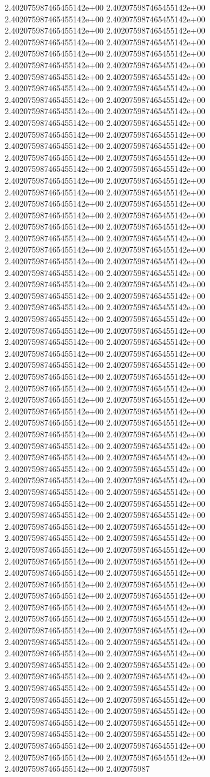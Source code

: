 2.402075987465455142e+00	2.402075987465455142e+00	2.402075987465455142e+00	2.402075987465455142e+00	2.402075987465455142e+00	2.402075987465455142e+00	2.402075987465455142e+00	2.402075987465455142e+00	2.402075987465455142e+00	2.402075987465455142e+00	2.402075987465455142e+00	2.402075987465455142e+00	2.402075987465455142e+00	2.402075987465455142e+00	2.402075987465455142e+00	2.402075987465455142e+00	2.402075987465455142e+00	2.402075987465455142e+00	2.402075987465455142e+00	2.402075987465455142e+00	2.402075987465455142e+00	2.402075987465455142e+00	2.402075987465455142e+00	2.402075987465455142e+00	2.402075987465455142e+00	2.402075987465455142e+00	2.402075987465455142e+00	2.402075987465455142e+00	2.402075987465455142e+00	2.402075987465455142e+00	2.402075987465455142e+00	2.402075987465455142e+00	2.402075987465455142e+00	2.402075987465455142e+00	2.402075987465455142e+00	2.402075987465455142e+00	2.402075987465455142e+00	2.402075987465455142e+00	2.402075987465455142e+00	2.402075987465455142e+00	2.402075987465455142e+00	2.402075987465455142e+00	2.402075987465455142e+00	2.402075987465455142e+00	2.402075987465455142e+00	2.402075987465455142e+00	2.402075987465455142e+00	2.402075987465455142e+00	2.402075987465455142e+00	2.402075987465455142e+00	2.402075987465455142e+00	2.402075987465455142e+00	2.402075987465455142e+00	2.402075987465455142e+00	2.402075987465455142e+00	2.402075987465455142e+00	2.402075987465455142e+00	2.402075987465455142e+00	2.402075987465455142e+00	2.402075987465455142e+00	2.402075987465455142e+00	2.402075987465455142e+00	2.402075987465455142e+00	2.402075987465455142e+00	2.402075987465455142e+00	2.402075987465455142e+00	2.402075987465455142e+00	2.402075987465455142e+00	2.402075987465455142e+00	2.402075987465455142e+00	2.402075987465455142e+00	2.402075987465455142e+00	2.402075987465455142e+00	2.402075987465455142e+00	2.402075987465455142e+00	2.402075987465455142e+00	2.402075987465455142e+00	2.402075987465455142e+00	2.402075987465455142e+00	2.402075987465455142e+00	2.402075987465455142e+00	2.402075987465455142e+00	2.402075987465455142e+00	2.402075987465455142e+00	2.402075987465455142e+00	2.402075987465455142e+00	2.402075987465455142e+00	2.402075987465455142e+00	2.402075987465455142e+00	2.402075987465455142e+00	2.402075987465455142e+00	2.402075987465455142e+00	2.402075987465455142e+00	2.402075987465455142e+00	2.402075987465455142e+00	2.402075987465455142e+00	2.402075987465455142e+00	2.402075987465455142e+00	2.402075987465455142e+00	2.402075987465455142e+00	2.402075987465455142e+00	2.402075987465455142e+00	2.402075987465455142e+00	2.402075987465455142e+00	2.402075987465455142e+00	2.402075987465455142e+00	2.402075987465455142e+00	2.402075987465455142e+00	2.402075987465455142e+00	2.402075987465455142e+00	2.402075987465455142e+00	2.402075987465455142e+00	2.402075987465455142e+00	2.402075987465455142e+00	2.402075987465455142e+00	2.402075987465455142e+00	2.402075987465455142e+00	2.402075987465455142e+00	2.402075987465455142e+00	2.402075987465455142e+00	2.402075987465455142e+00	2.402075987465455142e+00	2.402075987465455142e+00	2.402075987465455142e+00	2.402075987465455142e+00	2.402075987465455142e+00	2.402075987465455142e+00	2.402075987465455142e+00	2.402075987465455142e+00	2.402075987465455142e+00	2.402075987465455142e+00	2.402075987465455142e+00	2.402075987465455142e+00	2.402075987